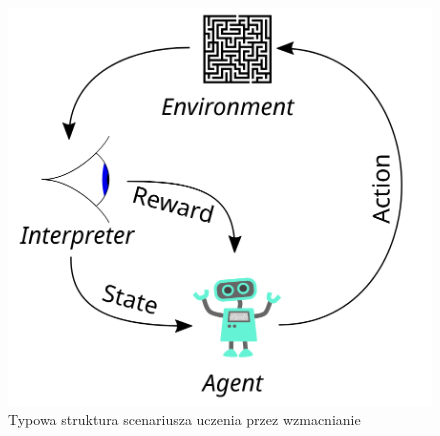 \documentclass[a4paper, 12pt]{article}
\numberwithin{equation}{section}
\begin{document}
    \begin{figure}[H]
        \centering
        \includegraphics[width=\textwidth]{pictures/Reinforcement_learning_diagram.png}
        \caption{Typowa struktura scenariusza uczenia przez wzmacnianie \cite{wikipedia_reinforcement_learning}}
    \end{figure}
\end{document}
